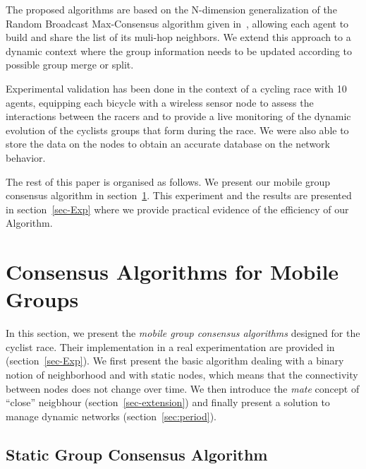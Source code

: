 \documentclass{sig-alternate}
\begin{document}
The proposed algorithms are based on the N-dimension generalization of the Random Broadcast Max-Consensus algorithm given in~\cite{Iutzeler2012}, allowing each agent to build and share the list of its muli-hop neighbors.
We extend this approach to a dynamic context where the group information needs to be updated according to possible group merge or split. 




Experimental validation has been done in the context of a cycling race with 10 agents, equipping each bicycle with a wireless sensor node to assess the interactions between the racers and to provide a live monitoring of the dynamic evolution of the cyclists groups that form during the race.
We were also able to store the data on the nodes to obtain an accurate database on the network behavior.



The rest of this paper is organised as follows. We present our mobile group consensus algorithm in section~\ref{sec-algo}. This experiment and the results are presented in section~\ref{sec-Exp} where  we provide practical evidence of the efficiency of our Algorithm.

















\section{Consensus Algorithms for Mobile Groups}
\label{sec-algo}
In this section, we present the {\em mobile group consensus algorithms} designed for the cyclist race. Their implementation in a real experimentation are provided in (section~\ref{sec-Exp}). We first present the basic algorithm 
dealing with a binary notion of neighborhood and with static nodes, which means that the connectivity between nodes
does not change over time. We then introduce the {\em mate} concept of ``close'' neigbhour (section~\ref{sec-extension}) and finally present a solution to manage dynamic networks (section~\ref{sec:period}).

\subsection{Static Group Consensus Algorithm}
\label{sec-static}
\end{document}
